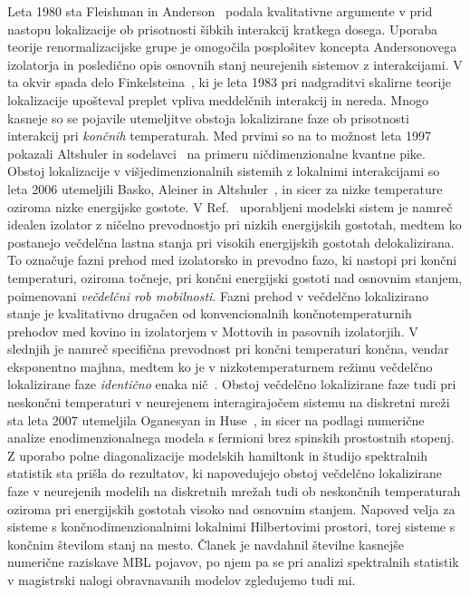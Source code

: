 \documentclass[10pt,a4paper]{article}
\begin{document}
Leta 1980 sta Fleishman in Anderson~\cite{fleishman1980interactions} podala kvalitativne argumente v prid nastopu lokalizacije ob prisotnosti šibkih interakcij kratkega dosega. Uporaba teorije renormalizacijske grupe je omogočila posplošitev koncepta Andersonovega izolatorja in posledično opis osnovnih stanj neurejenih sistemov z interakcijami. V ta okvir spada delo Finkelsteina~\cite{finkelshtein1983influence}, ki je leta 1983 pri nadgraditvi skalirne teorije lokalizacije upošteval preplet vpliva meddelčnih interakcij in nereda. Mnogo kasneje so se pojavile utemeljitve obstoja lokalizirane faze ob prisotnosti interakcij pri \emph{končnih} temperaturah. Med prvimi so na to možnost leta 1997 pokazali Altshuler in sodelavci~\cite{altshuler1997quasiparticle} na primeru ničdimenzionalne kvantne pike. Obstoj lokalizacije v višjedimenzionalnih sistemih z lokalnimi interakcijami so leta 2006 utemeljili Basko, Aleiner in Altshuler~\cite{basko2006metal}, in sicer za nizke temperature oziroma nizke energijske gostote. V Ref.~\cite{basko2006metal} uporabljeni modelski sistem je namreč idealen izolator z ničelno prevodnostjo pri nizkih energijskih gostotah, medtem ko postanejo večdelčna lastna stanja pri visokih energijskih gostotah delokalizirana. To označuje fazni prehod med izolatorsko in prevodno fazo, ki nastopi pri končni temperaturi, oziroma točneje, pri končni energijski gostoti nad osnovnim stanjem, poimenovani \emph{večdelčni rob mobilnosti}. Fazni prehod v večdelčno lokalizirano stanje je kvalitativno drugačen od konvencionalnih končnotemperaturnih prehodov med kovino in izolatorjem v Mottovih in pasovnih izolatorjih. V slednjih je namreč specifična prevodnost pri končni temperaturi končna, vendar eksponentno majhna, medtem ko je v nizkotemperaturnem režimu večdelčno lokalizirane faze \emph{identično} enaka nič~\cite{basko2006problem}. Obstoj večdelčno lokalizirane faze tudi pri neskončni temperaturi v neurejenem interagirajočem sistemu na diskretni mreži sta leta 2007 utemeljila Oganesyan in Huse~\cite{PhysRevB.75.155111}, in sicer na podlagi numerične analize enodimenzionalnega modela s fermioni brez spinskih prostostnih stopenj. Z uporabo polne diagonalizacije modelskih hamiltonk in študijo spektralnih statistik sta prišla do rezultatov, ki napovedujejo obstoj večdelčno lokalizirane faze v neurejenih modelih na diskretnih mrežah tudi ob neskončnih temperaturah oziroma pri energijskih gostotah visoko nad osnovnim stanjem. Napoved velja za sisteme s končnodimenzionalnimi lokalnimi Hilbertovimi prostori, torej sisteme s končnim številom stanj na mesto. 
Članek je navdahnil številne kasnejše numerične raziskave MBL pojavov, po njem pa se pri analizi spektralnih statistik v magistrski nalogi obravnavanih modelov zgledujemo tudi mi.
\end{document}

